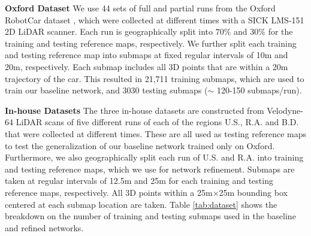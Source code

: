 \documentclass[10pt,twocolumn,letterpaper]{article}
\begin{document}
\noindent\textbf{Oxford Dataset} We use 44 sets of full and partial runs from the Oxford RobotCar dataset \cite{RobotCarDatasetIJRR}, which were collected at different times with a SICK LMS-151 2D LiDAR scanner. Each run is geographically split into $70\%$ and $30\%$ for the training and testing reference maps, respectively. We further split each training and testing reference map into submaps at fixed regular intervals of 10m and 20m, respectively. Each submap includes all 3D points that are within a 20m trajectory of the car. This resulted in 21,711 training submaps, which are used to train our baseline network, and 3030 testing submaps ($\sim$ 120-150 submaps/run). 
\newline
\vspace{-0.3cm}

\noindent\textbf{In-house Datasets} The three in-house datasets are constructed from Velodyne-64 LiDAR scans of five different runs of each of the regions U.S., R.A. and B.D. that were collected at different times. These are all used as testing reference maps to test the generalization of our baseline network trained only on Oxford. Furthermore, we also geographically split each run of U.S. and R.A. into training and testing reference maps, which we use for network refinement. Submaps are taken at regular intervals of 12.5m and 25m for each training and testing reference maps, respectively. All 3D points within a 25m$\times$25m bounding box centered at each submap location are taken. Table \ref{tab:dataset} shows the breakdown on the number of training and testing submaps used in the baseline and refined networks.
\end{document}
